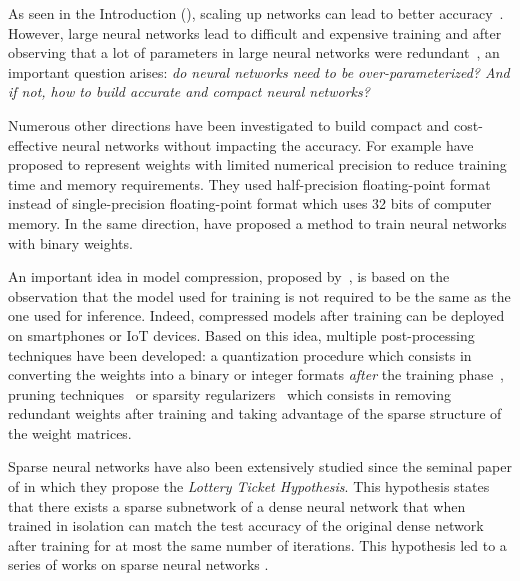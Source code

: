 As seen in the Introduction (), scaling up networks can lead to better accuracy~\cite{krizhevsky2012imagenet,he2016deep,vaswani2017attention}.
However, large neural networks lead to difficult and expensive training and after observing that a lot of parameters in large neural networks were redundant~\cite{dai2018compressing,frankle2018lottery}, an important question arises: \emph{do neural networks need to be over-parameterized? And if not, how to build accurate and compact neural networks?} 

Numerous other directions have been investigated to build compact and cost-effective neural networks without impacting the accuracy.
For example \citet{gupta2015deep,micikevicius2018mixed} have proposed to represent weights with limited numerical precision to reduce training time and memory requirements.
They used half-precision floating-point format instead of single-precision floating-point format which uses 32 bits of computer memory.
In the same direction, \citet{courbariaux2015binaryconnect} have proposed a method to train neural networks with binary weights.

An important idea in model compression, proposed by~\citet{bucilua2006model}, is based on the observation that the model used for training is not required to be the same as the one used for inference.
Indeed, compressed models after training can be deployed on smartphones or IoT devices.
Based on this idea, multiple post-processing techniques have been developed: a quantization procedure which consists in converting the weights into a binary or integer formats \emph{after} the training phase~\cite{mellempudi2017ternary,rastegariECCV16}, pruning techniques~\cite{dai2018compressing,han2015deep,lin2017runtime} or sparsity regularizers~\cite{collins2014memory,dai2018compressing,liu2015sparse} which consists in removing redundant weights after training and taking advantage of the sparse structure of the weight matrices.

Sparse neural networks have also been extensively studied since the seminal paper of \citet{frankle2018lottery} in which they propose the \emph{Lottery Ticket Hypothesis}. 
This hypothesis states that there exists a sparse subnetwork of a dense neural network that when trained in isolation can match the test accuracy of the original dense network after training for at most the same number of iterations. 
This hypothesis led to a series of works on sparse neural networks \cite{zhou2019deconstructing,malach2019proving,evci2020rigging}.

